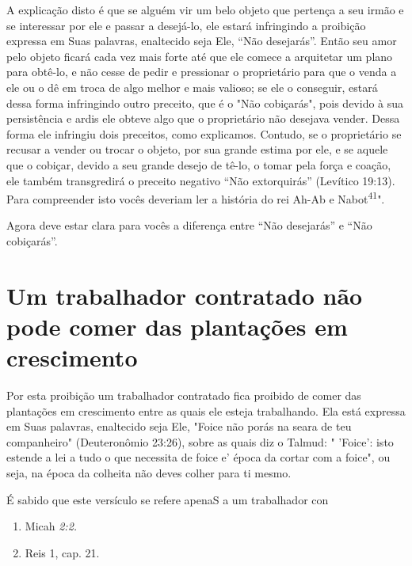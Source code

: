 A explicação disto é que se alguém vir um belo objeto que pertença a seu
irmão e se interessar por ele e passar a desejá-lo, ele estará
infringindo a proibição expressa em Suas palavras, enaltecido seja Ele,
``Não desejarás''. Então seu amor pelo objeto ficará cada vez mais forte
até que ele comece a arquitetar um plano para obtê-lo, e não cesse de
pedir e pressionar o proprietário para que o venda a ele ou o dê em
troca de algo melhor e mais valioso; se ele o conseguir, estará dessa
forma infringindo outro preceito, que é o "Não cobiça­rás", pois devido
à sua persistência e ardis ele obteve algo que o proprietário não
desejava vender. Dessa forma ele infringiu dois preceitos, como
explica­mos. Contudo, se o proprietário se recusar a vender ou trocar o
objeto, por sua grande estima por ele, e se aquele que o cobiçar, devido
a seu grande dese­jo de tê-lo, o tomar pela força e coação, ele também
transgredirá o preceito negativo ``Não extorquirás'' (Levítico 19:13).
Para compreender isto vocês de­veriam ler a história do rei Ah-Ab e
Nabot\textsuperscript{41}".

Agora deve estar clara para vocês a diferença entre ``Não desejarás'' e
``Não cobiçarás''.

\section{Um trabalhador contratado não pode comer das plantações em crescimento}

Por esta proibição um trabalhador contratado fica proibido de co­mer das
plantações em crescimento entre as quais ele esteja trabalhando. Ela
está expressa em Suas palavras, enaltecido seja Ele, "Foice não porás na
seara de teu companheiro" (Deuteronômio 23:26), sobre as quais diz o
Talmud: " 'Foi­ce': isto estende a lei a tudo o que necessita de foice
e' época da cortar com a foice", ou seja, na época da colheita não deves
colher para ti mesmo.


É sabido que este versículo se refere apenaS a um trabalhador con

\begin{enumerate}
\def\labelenumi{\arabic{enumi}.}
\setcounter{enumi}{408}
\item
 
 Micah \emph{2:2.}
 
\item
 
 Reis 1, cap. 21.
 
\end{enumerate}




